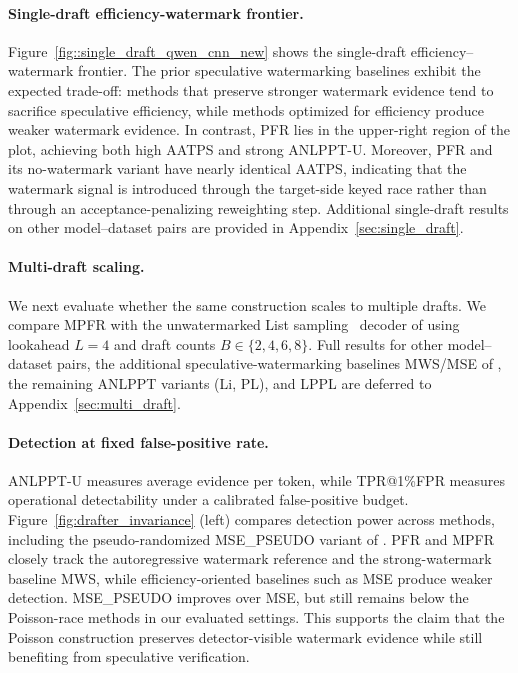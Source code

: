 \documentclass{article}
\theoremstyle{plain}
\theoremstyle{definition}
\begin{document}
\paragraph{Single-draft efficiency-watermark frontier.}
Figure~\ref{fig::single_draft_qwen_cnn_new} shows the single-draft
efficiency--watermark frontier. The prior speculative watermarking baselines exhibit
the expected trade-off: methods that preserve stronger watermark evidence tend to
sacrifice speculative efficiency, while methods optimized for efficiency produce
weaker watermark evidence. In contrast, \textsc{PFR} lies in the upper-right region
of the plot, achieving both high AATPS and strong ANLPPT-U. Moreover,
\textsc{PFR} and its no-watermark variant have nearly identical AATPS, indicating
that the watermark signal is introduced through the target-side keyed race rather
than through an acceptance-penalizing reweighting step. Additional single-draft
results on other model--dataset pairs are provided in Appendix~\ref{sec:single_draft}.

\paragraph{Multi-draft scaling.}
We next evaluate whether the same construction scales to multiple drafts. We compare
\textsc{MPFR} with the unwatermarked List sampling~\citep{rowan2025list} decoder of
\citet{rowan2025list} using lookahead $L=4$ and draft counts $B\in\{2,4,6,8\}$.
 Full results for
other model--dataset pairs, the additional speculative-watermarking baselines
\textsc{MWS}/\textsc{MSE} of \citet{hu2024inevitable}, the remaining ANLPPT
variants (Li, PL), and LPPL are deferred to Appendix~\ref{sec:multi_draft}.



\paragraph{Detection at fixed false-positive rate.}
ANLPPT-U measures average evidence per token, while TPR@1\%FPR measures operational
detectability under a calibrated false-positive budget. Figure~\ref{fig:drafter_invariance}
(left) compares detection power across methods, including the pseudo-randomized
\textsc{MSE\_PSEUDO} variant of \citet{he2026improving}. \textsc{PFR} and
\textsc{MPFR} closely track the autoregressive watermark reference and the
strong-watermark baseline \textsc{MWS}, while efficiency-oriented baselines such as
\textsc{MSE} produce weaker detection. \textsc{MSE\_PSEUDO} improves over
\textsc{MSE}, but still remains below the Poisson-race methods in our evaluated
settings. This supports the claim that the Poisson construction preserves
detector-visible watermark evidence while still benefiting from speculative
verification.
\end{document}
